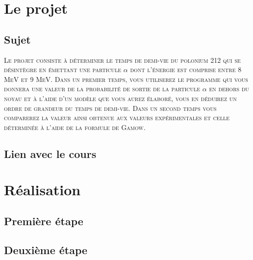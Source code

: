 \documentclass[12pt,a4paper]{report}
\begin{document}

   \dominitoc
   \tableofcontents
   \chapter{Le projet}
      \section{Sujet}
      	\textsc{Le  projet  consiste  à  déterminer  le  temps  de  demi-vie  du  polonium 212 qui  se désintègre en émettant une particule $\alpha$ dont l’énergie est comprise entre 8 MeV et 9 MeV. Dans un premier temps, vous utiliserez le programme qui vous donnera une valeur de la probabilité de sortie de la particule $\alpha$ en dehors du noyau et à l’aide d’un modèle que vous aurez élaboré, vous en déduirez un ordre de grandeur du temps de demi-vie. Dans un second temps vous comparerez la valeur ainsi obtenue aux valeurs expérimentales et celle déterminée à l’aide de la formule de Gamow.}
      \section{Lien avec le cours}
   \chapter{Réalisation}
   		\section{Première étape}
   		\section{Deuxième étape}
\end{document}
